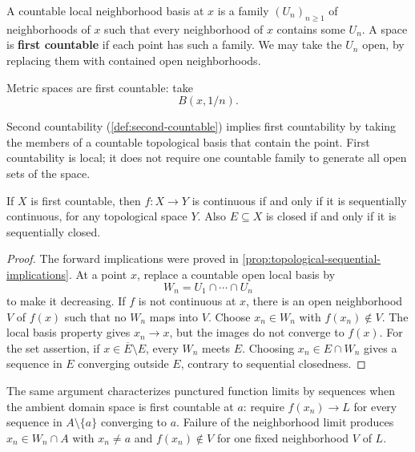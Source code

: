 \begin{definition}\label{def:first-countable}
A countable local neighborhood basis at $x$ is a family
$(U_n)_{n\geq1}$ of neighborhoods of $x$ such that every neighborhood
of $x$ contains some $U_n$. A space is \textbf{first countable} if each
point has such a family. We may take the $U_n$ open, by replacing them
with contained open neighborhoods.
\end{definition}
Metric spaces are first countable: take
\[
B(x,1/n).
\]

Second countability (\cref{def:second-countable}) implies first
countability by taking the members of a countable topological basis
that contain the point. First countability is local; it does not require
one countable family to generate all open sets of the space.

\begin{theorem}\label{thm:first-countable-tests}
If $X$ is first countable, then $f:X\to Y$ is continuous if and only
if it is sequentially continuous, for any topological space $Y$.
Also $E\subseteq X$ is closed if and only if it is sequentially closed.
\end{theorem}
\begin{proof}
The forward implications were proved in
\cref{prop:topological-sequential-implications}. At a point $x$, replace
a countable open local basis by
\[
W_n=U_1\cap\cdots\cap U_n
\]
 to make
it decreasing. If $f$ is not continuous at $x$, there is an open
neighborhood $V$ of $f(x)$ such that no $W_n$ maps into $V$.
Choose $x_n\in W_n$ with $f(x_n)\notin V$. The local basis property
gives $x_n\to x$, but the images do not converge to $f(x)$.
For the set assertion, if $x\in\overline E\setminus E$, every $W_n$
meets $E$. Choosing $x_n\in E\cap W_n$ gives a sequence in $E$
converging outside $E$, contrary to sequential closedness.
\end{proof}
The same argument characterizes punctured function limits by sequences
when the ambient domain space is first countable at $a$: require
$f(x_n)\to L$ for every sequence in $A\setminus\{a\}$ converging to $a$.
Failure of the neighborhood limit produces $x_n\in W_n\cap A$ with
$x_n\ne a$ and $f(x_n)\notin V$ for one fixed neighborhood $V$ of $L$.

